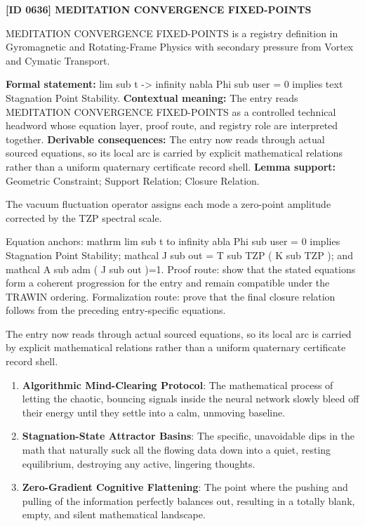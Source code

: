 \clearpage
\noindent\textbf{[ID 0636] MEDITATION CONVERGENCE FIXED-POINTS}\par
\vspace{0.35em}
\begingroup\small
{}
MEDITATION CONVERGENCE FIXED-POINTS is a registry definition in Gyromagnetic and Rotating-Frame Physics with secondary pressure from Vortex and Cymatic Transport.

\begingroup\footnotesize\setlength{\emergencystretch}{3em}\sloppy
\textbf{Formal statement:} lim sub t -> infinity nabla Phi sub user = 0 implies text Stagnation Point Stability. \textbf{Contextual meaning:} The entry reads MEDITATION CONVERGENCE FIXED-POINTS as a controlled technical headword whose equation layer, proof route, and registry role are interpreted together. \textbf{Derivable consequences:} The entry now reads through actual sourced equations, so its local arc is carried by explicit mathematical relations rather than a uniform quaternary certificate record shell. \textbf{Lemma support:} Geometric Constraint; Support Relation; Closure Relation.\par
\endgroup

The vacuum fluctuation operator assigns each mode a zero-point amplitude corrected by the TZP spectral scale.

Equation anchors: mathrm lim sub t to infinity abla Phi sub user = 0 implies Stagnation Point Stability; mathcal J sub out = T sub TZP ( K sub TZP ); and mathcal A sub adm ( J sub out )=1. Proof route: show that the stated equations form a coherent progression for the entry and remain compatible under the TRAWIN ordering. Formalization route: prove that the final closure relation follows from the preceding entry-specific equations.

The entry now reads through actual sourced equations, so its local arc is carried by explicit mathematical relations rather than a uniform quaternary certificate record shell.
\endgroup

\begin{enumerate}[leftmargin=1.6em,itemsep=6pt,topsep=4pt]
\item \textbf{Algorithmic Mind-Clearing Protocol}: The mathematical process of letting the chaotic, bouncing signals inside the neural network slowly bleed off their energy until they settle into a calm, unmoving baseline.
\item \textbf{Stagnation-State Attractor Basins}: The specific, unavoidable dips in the math that naturally suck all the flowing data down into a quiet, resting equilibrium, destroying any active, lingering thoughts.
\item \textbf{Zero-Gradient Cognitive Flattening}: The point where the pushing and pulling of the information perfectly balances out, resulting in a totally blank, empty, and silent mathematical landscape.
\end{enumerate}

